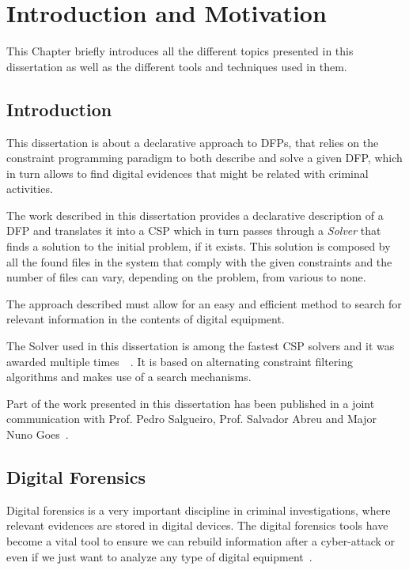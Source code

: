 \chapter{Introduction and Motivation}

This Chapter briefly introduces all the different topics presented in this dissertation as well as the different tools and techniques used in them.

\section{Introduction}

This dissertation is about a declarative approach to \acfp{DFP}, that relies on the constraint programming paradigm to both describe and solve a given \acf{DFP}, which in turn allows to find digital evidences that might be related with criminal activities.

The work described in this dissertation provides a declarative description of a \acf{DFP} and translates it into a \acf{CSP} which in turn passes through a \textit{Solver} that finds a solution to the initial problem, if it exists. This solution is composed by all the found files in the system that comply with the given constraints and the number of files can vary, depending on the problem, from various to none.

The approach described must allow for an easy and efficient method to search for relevant information in the contents of digital equipment.

The Solver used in this dissertation is among the fastest \ac{CSP} solvers and it was awarded multiple times~\cite{aboutChoco}~\cite{chocoSolver}. It is based on alternating constraint filtering algorithms and makes use of a search mechanisms.

Part of the work presented in this dissertation has been published in a joint communication with Prof. Pedro Salgueiro, Prof. Salvador Abreu and Major Nuno Goes~\cite{2018communication}.


\section{Digital Forensics}

Digital forensics is a very important discipline in criminal investigations, where relevant evidences are stored in digital devices. The digital forensics tools have become a vital tool to ensure we can rebuild information after a cyber-attack or even if we just want to analyze any type of digital equipment~\cite{Garfinkel2010}.


